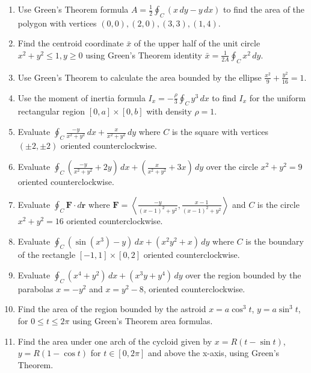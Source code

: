 \documentclass[11pt]{article}
\begin{document}
\begin{enumerate}[label=\textbf{Q\arabic*.}, leftmargin=*]
    \item Use Green's Theorem formula $A = \frac{1}{2} \oint_C (x \,dy - y \,dx)$ to find the area of the polygon with vertices $(0,0), (2,0), (3,3), (1,4)$.
    \item Find the centroid coordinate $\bar{x}$ of the upper half of the unit circle $x^2+y^2 \le 1, y \ge 0$ using Green's Theorem identity $\bar{x} = \frac{1}{2A} \oint_C x^2 \,dy$.
    \item Use Green's Theorem to calculate the area bounded by the ellipse $\frac{x^2}{9} + \frac{y^2}{16} = 1$.
    \item Use the moment of inertia formula $I_x = -\frac{\rho}{3} \oint_C y^3 \,dx$ to find $I_x$ for the uniform rectangular region $[0, a] \times [0, b]$ with density $\rho=1$.
    
    \item Evaluate $\oint_C \frac{-y}{x^2+y^2} \,dx + \frac{x}{x^2+y^2} \,dy$ where $C$ is the square with vertices $(\pm 2, \pm 2)$ oriented counterclockwise.
    \item Evaluate $\oint_C \left(\frac{-y}{x^2+y^2} + 2y\right) \,dx + \left(\frac{x}{x^2+y^2} + 3x\right) \,dy$ over the circle $x^2+y^2 = 9$ oriented counterclockwise.
    \item Evaluate $\oint_C \mathbf{F} \cdot d\mathbf{r}$ where $\mathbf{F} = \left\langle \frac{-y}{(x-1)^2+y^2}, \frac{x-1}{(x-1)^2+y^2} \right\rangle$ and $C$ is the circle $x^2+y^2=16$ oriented counterclockwise.
    
    \item Evaluate $\oint_C (\sin(x^3) - y) \,dx + (x^2 y^2 + x) \,dy$ where $C$ is the boundary of the rectangle $[-1,1] \times [0,2]$ oriented counterclockwise.
    \item Evaluate $\oint_C (x^4 + y^2) \,dx + (x^3 y + y^4) \,dy$ over the region bounded by the parabolas $x = -y^2$ and $x = y^2 - 8$, oriented counterclockwise.
    
    \item Find the area of the region bounded by the astroid $x = a \cos^3 t$, $y = a \sin^3 t$, for $0 \le t \le 2\pi$ using Green's Theorem area formulas.
    \item Find the area under one arch of the cycloid given by $x = R(t - \sin t)$, $y = R(1 - \cos t)$ for $t \in [0, 2\pi]$ and above the x-axis, using Green's Theorem.
\end{enumerate}
\end{document}
